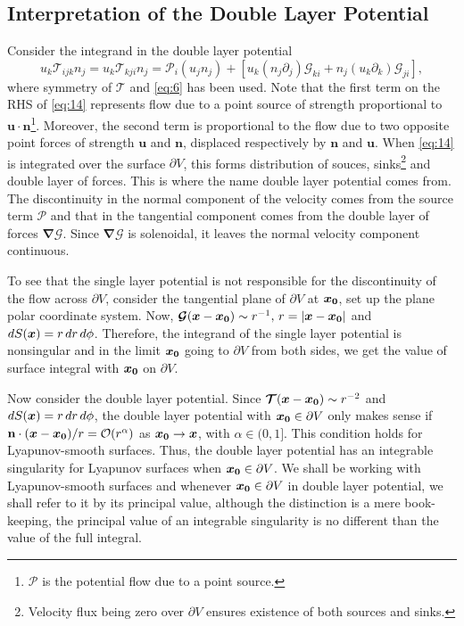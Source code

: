 \documentclass[12pt]{article}
\begin{document}
\subsection{Interpretation of the Double Layer Potential}
Consider the integrand in the double layer potential 
\begin{equation}
	\label{eq:14}
	u_k \mathcal{T}_{ijk} n_j = u_k \mathcal{T}_{kji} n_j = \mathcal{P}_i (u_j n_j) + \left[  u_k(n_j \partial_j) \mathcal{G}_{ki} +  n_j(u_k\partial_k) \mathcal{G}_{ji} \right] ,
\end{equation}
where symmetry of $\boldsymbol{\mathcal{T}}$ and \eqref{eq:6} has been used. Note that the first term on the RHS of \eqref{eq:14} represents flow due to a point source of strength proportional to $\boldsymbol{u}\cdot \textbf{n}$\footnote{$\boldsymbol{\mathcal{P}}$ is the potential flow due to a point source.}. Moreover, the second term is proportional to the flow due to two opposite point forces of strength $\boldsymbol{u}$ and $\textbf{n}$, displaced respectively by $\textbf{n}$ and $\boldsymbol{u}$. When \eqref{eq:14} is integrated over the surface $\partial V$, this forms distribution of souces, sinks\footnote{Velocity flux being zero over $\partial V$ ensures existence of both sources and sinks.} and double layer of forces. This is where the name double layer potential comes from. The discontinuity in the normal component of the velocity comes from the source term $\boldsymbol{\mathcal{P}}$ and that in the tangential component comes from the double layer of forces $\boldsymbol{\nabla} \boldsymbol{\mathcal{G}}$. Since $\boldsymbol{\nabla}\boldsymbol{\mathcal{G}}$ is solenoidal, it leaves the normal velocity component continuous. 

To see that the single layer potential is not responsible for the discontinuity of the flow across $\partial V$, consider the tangential plane of $\partial V$ at $\boldsymbol{x_0}$, set up the plane polar coordinate system. Now, $\boldsymbol{\mathcal{G}}(\boldsymbol{x} - \boldsymbol{x_0}) \sim r^{-1}, \, r=|\boldsymbol{x} - \boldsymbol{x_0}|$ and $dS(\boldsymbol{x}) = r\, dr\, d\phi$. Therefore, the integrand of the single layer potential is nonsingular and in the limit $\boldsymbol{x_0}$ going to $\partial V$ from both sides, we get the value of surface integral with $\boldsymbol{x_0}$ on $\partial V$.	

Now consider the double layer potential. Since $\boldsymbol{\mathcal{T}}(\boldsymbol{x} - \boldsymbol{x_0}) \sim r^{-2}$ and $dS(\boldsymbol{x}) = r\, dr\, d\phi$, the double layer potential with $\boldsymbol{x_0} \in \partial V$ only makes sense if $\textbf{n} \cdot (\boldsymbol{x} - \boldsymbol{x_0})/r = \mathcal{O}(r^\alpha)$ as $\boldsymbol{x_0} \to \boldsymbol{x}$, with $\alpha \in (0,1].$ This condition holds for Lyapunov-smooth surfaces. Thus, the double layer potential has an integrable singularity for Lyapunov surfaces when $\boldsymbol{x_0} \in \partial V$. We shall be working with Lyapunov-smooth surfaces and whenever $\boldsymbol{x_0} \in \partial V$ in double layer potential, we shall refer to it by its principal value, although the distinction is a mere book-keeping, the principal value of an integrable singularity is no different than the value of the full integral. 
\end{document}
